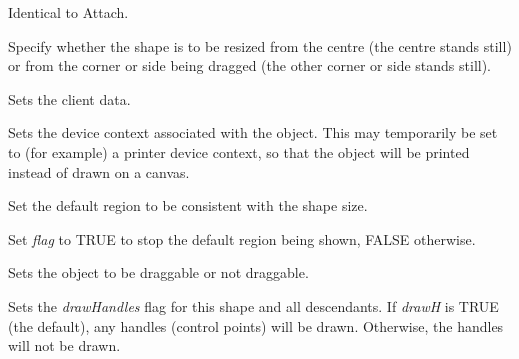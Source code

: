 

Identical to Attach.



Specify whether the shape is to be resized from the centre (the centre stands still) or from the corner or side
being dragged (the other corner or side stands still).



Sets the client data.




Sets the device context associated with the object. This may temporarily be set
to (for example) a printer device context, so that the object will be printed
instead of drawn on a canvas.

\label{setdefaultregionsize}


Set the default region to be consistent with the shape size.



Set {\it flag} to TRUE to stop the default region being shown, FALSE otherwise.



Sets the object to be draggable or not draggable.



Sets the {\it drawHandles} flag for this shape and all descendants. If {\it drawH} is TRUE (the default),
any handles (control points) will be drawn. Otherwise, the handles will not be drawn.



